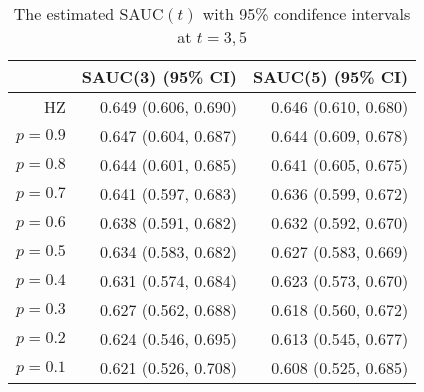 \begin{table}[!htb]

\caption{\label{tab:sauc-ki67}The estimated SAUC$(t)$ with 95\% condifence intervals at $t=3,5$}
\centering
\begin{tabular}[t]{rrr}
\toprule
 & SAUC(3) (95\% CI) & SAUC(5) (95\% CI)\\
\midrule
HZ & 0.649 (0.606, 0.690) & 0.646 (0.610, 0.680)\\
$p=0.9$ & 0.647 (0.604, 0.687) & 0.644 (0.609, 0.678)\\
$p=0.8$ & 0.644 (0.601, 0.685) & 0.641 (0.605, 0.675)\\
$p=0.7$ & 0.641 (0.597, 0.683) & 0.636 (0.599, 0.672)\\
$p=0.6$ & 0.638 (0.591, 0.682) & 0.632 (0.592, 0.670)\\
$p=0.5$ & 0.634 (0.583, 0.682) & 0.627 (0.583, 0.669)\\
$p=0.4$ & 0.631 (0.574, 0.684) & 0.623 (0.573, 0.670)\\
$p=0.3$ & 0.627 (0.562, 0.688) & 0.618 (0.560, 0.672)\\
$p=0.2$ & 0.624 (0.546, 0.695) & 0.613 (0.545, 0.677)\\
$p=0.1$ & 0.621 (0.526, 0.708) & 0.608 (0.525, 0.685)\\
\bottomrule
\end{tabular}
\end{table}
